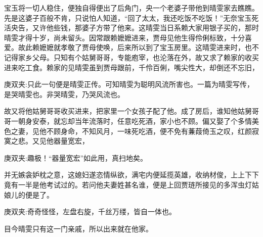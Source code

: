 \begin{parag}
    宝玉将一切人稳住，便独自得便出了后角门，央一个老婆子带他到晴雯家去瞧瞧。先是这婆子百般不肯，只说怕人知道，“回了太太，我还吃饭不吃饭！”无奈宝玉死活央告，又许他些钱，那婆子方带了他来。这晴雯当日系赖大家用银子买的，那时晴雯才得十岁，尚未留头。因常跟赖嬷嬷进来，贾母见他生得伶俐标致，十分喜爱。故此赖嬷嬷就孝敬了贾母使唤，后来所以到了宝玉房里。这晴雯进来时，也不记得家乡父母。只知有个姑舅哥哥，专能庖宰，也沦落在外，故又求了赖家的收买进来吃工食。赖家的见晴雯虽到贾母跟前，千伶百俐，嘴尖性大，却倒还不忘旧，\begin{note}庚双夹:只此一句便是晴雯正传。可知晴雯为聪明风流所害也。一篇为晴雯写传，是哭晴雯也。非哭晴雯，乃哭风流也。\end{note}故又将他姑舅哥哥收买进来，把家里一个女孩子配了他。成了房后，谁知他姑舅哥哥一朝身安泰，就忘却当年流落时，任意吃死酒，家小也不顾。偏又娶了个多情美色之妻，见他不顾身命，不知风月，一味死吃酒，便不免有蒹葭倚玉之叹，红颜寂寞之悲。又见他器量宽宏，\begin{note}庚双夹:趣极！“器量宽宏”如此用，真扫地矣。\end{note}并无嫉衾妒枕之意，这媳妇遂恣情纵欲，满宅内便延揽英雄，收纳材俊，上上下下竟有一半是他考试过的。若问他夫妻姓甚名谁，便是上回贾琏所接见的多浑虫灯姑娘儿的便是了。\begin{note}庚双夹:奇奇怪怪，左盘右旋，千丝万缕，皆自一体也。\end{note}目今晴雯只有这一门亲戚，所以出来就在他家。
\end{parag}


